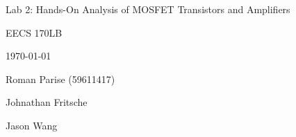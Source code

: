 \centering
\vspace{2.5cm}
{\huge Lab 2: Hands-On Analysis of MOSFET Transistors and Amplifiers \par}
{\Large EECS 170LB \par}
{\Large \today \par}
{\large Roman Parise (59611417) \par}
{\large Johnathan Fritsche \par}
{\large Jason Wang \par}
\vspace{1cm}
\vspace{1cm}
